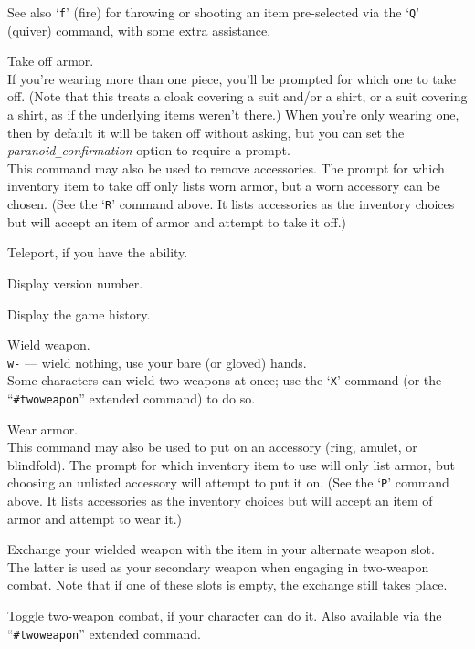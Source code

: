 See also `{\tt f}' (fire) for throwing or shooting an item pre-selected
via the `{\tt Q}' (quiver) command, with some extra assistance.
\item[\tb{T}]
Take off armor.\\
If you're wearing more than one piece, you'll be prompted for which
one to take off.  (Note that this treats a cloak covering a suit
and/or a shirt, or a suit covering a shirt, as if the underlying items
weren't there.)
When you're only wearing one, then by default it will
be taken off without asking, but you can set the
{\it paranoid\verb+_+confirmation\/}
option to require a prompt.\\
This command may also be used to remove accessories.  The prompt
for which inventory item to take off only lists worn armor, but a worn
accessory can be chosen.
(See the `{\tt R}' command above.  It lists accessories as the inventory
choices but will accept an item of armor and attempt to take it off.)
\item[\tb{\^{}T}]
Teleport, if you have the ability.
\item[\tb{v}]
Display version number.
\item[\tb{V}]
Display the game history.
\item[\tb{w}]
Wield weapon.\\
{\tt w-} --- wield nothing, use your bare (or gloved) hands.\\
Some characters can wield two weapons at once; use the `{\tt X}' command
(or the ``{\tt \#twoweapon}'' extended command) to do so.
\item[\tb{W}]
Wear armor.\\
This command may also be used to put on an accessory (ring, amulet, or
blindfold).  The prompt for which inventory item to use will only list
armor, but choosing an unlisted accessory will attempt to put it on.
(See the `{\tt P}' command above.  It lists accessories as the inventory
choices but will accept an item of armor and attempt to wear it.)
\item[\tb{x}]
Exchange your wielded weapon with the item in your alternate weapon slot.\\
The latter is used as your secondary weapon when engaging in
two-weapon combat.  Note that if one of these slots is empty,
the exchange still takes place.
\item[\tb{X}]
Toggle two-weapon combat, if your character can do it.  Also available
via the ``{\tt \#twoweapon}'' extended command.\\
